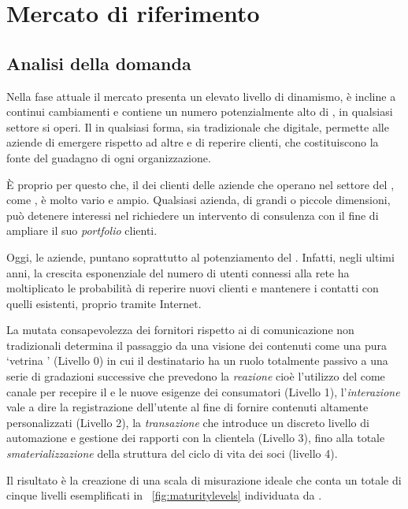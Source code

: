 \chapter{Mercato di riferimento}
\section{Analisi della domanda}\label{sec:domanda}

Nella fase attuale il mercato presenta un elevato livello di dinamismo, è incline a continui cambiamenti e contiene un numero potenzialmente alto di , in qualsiasi settore si operi. Il \mktg in qualsiasi forma, sia tradizionale che digitale, permette alle aziende di emergere rispetto ad altre e di reperire clienti, che costituiscono la fonte del guadagno di ogni organizzazione.

È  proprio per questo che, il  dei clienti delle aziende che operano nel settore del \mktg, come \customer, è molto vario e ampio. Qualsiasi azienda, di grandi o piccole dimensioni, può detenere interessi nel richiedere un intervento di consulenza \mktg con il fine di ampliare il suo \textit{portfolio} clienti.

Oggi, le aziende, puntano soprattutto al potenziamento del \mktg {}. Infatti, negli ultimi anni, la crescita esponenziale del numero di utenti connessi alla rete ha moltiplicato le probabilità di reperire nuovi clienti e mantenere i contatti con quelli esistenti, proprio tramite Internet.

La mutata consapevolezza dei fornitori rispetto ai  di comunicazione non tradizionali determina il passaggio da una visione dei contenuti  come una pura `vetrina ' (Livello 0) in cui il destinatario ha un ruolo totalmente passivo a una serie di gradazioni successive che prevedono la \emph{reazione} cioè l'utilizzo del  come canale per recepire il  e le nuove esigenze dei consumatori (Livello 1), l'\emph{interazione} vale a dire la registrazione dell'utente al fine di fornire contenuti altamente personalizzati (Livello 2), la \emph{transazione} che introduce un discreto livello di automazione e gestione dei rapporti con la clientela (Livello 3), fino alla totale \emph{smaterializzazione} della struttura del ciclo di vita dei soci (livello 4).

Il risultato è la creazione di una scala di misurazione ideale che conta un totale di cinque livelli esemplificati in \figurename~\ref{fig:maturitylevels} individuata da \cite[\textit{pag. 90 e succ.}]{gerrard:ebusiness}.

